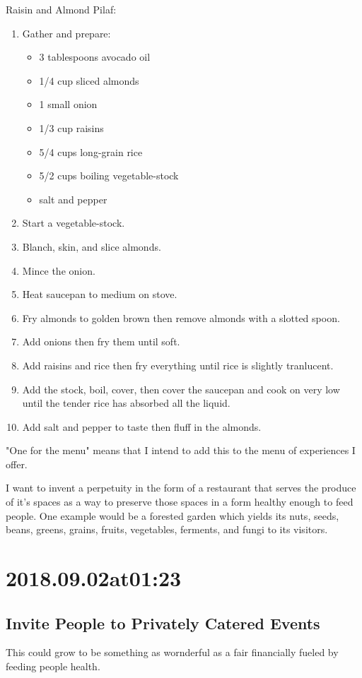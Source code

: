 Raisin and Almond Pilaf:
\begin{enumerate}
  \item Gather and prepare:
    \begin{itemize}
      \item 3 tablespoons avocado oil
      \item 1/4 cup sliced almonds
      \item 1 small onion
      \item 1/3 cup raisins
      \item 5/4 cups long-grain rice
      \item 5/2 cups boiling vegetable-stock
      \item salt and pepper
    \end{itemize}
  \item Start a vegetable-stock.
  \item Blanch, skin, and slice almonds.
  \item Mince the onion.
  \item Heat saucepan to medium on stove.
  \item Fry almonds to golden brown then remove almonds with a slotted spoon.
  \item Add onions then fry them until soft.
  \item Add raisins and rice then fry everything until rice is slightly tranlucent.
  \item Add the stock, boil, cover, then cover the saucepan and cook on very low until the tender rice has absorbed all the liquid.
  \item Add salt and pepper to taste then fluff in the almonds.
\end{enumerate}

  "One for the menu" means that I intend to add this to the menu of experiences I offer.

  I want to invent a perpetuity in the form of a restaurant that serves the produce of it's spaces as a way to preserve those spaces in a form healthy enough to feed people.
  One example would be a forested garden which yields its nuts, seeds, beans, greens, grains, fruits, vegetables, ferments, and fungi to its visitors.

  \section*{ 2018.09.02at01:23 }
  \subsection*{ Invite People to Privately Catered Events }
This could grow to be something as wornderful as a fair financially fueled by feeding people health.

